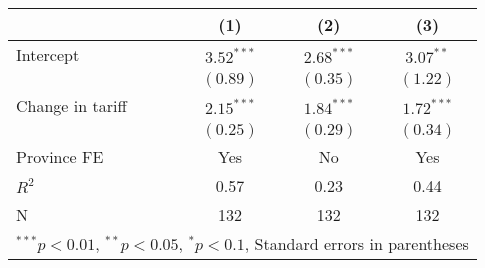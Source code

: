 
\begin{tabular}{l c c c }
\hline
 & (1) & (2) & (3) \\
\hline
Intercept & $3.52^{***}$ & $2.68^{***}$ & $3.07^{**}$  \\
            & $(0.89)$     & $(0.35)$     & $(1.22)$     \\
Change in tariff     & $2.15^{***}$ & $1.84^{***}$ & $1.72^{***}$ \\
            & $(0.25)$     & $(0.29)$     & $(0.34)$     \\
\hline
Province FE &  Yes         & No      & Yes             \\ 
\hline
$R^2$       & 0.57         & 0.23         & 0.44         \\
N           & 132          & 132          & 132          \\
\hline
\multicolumn{4}{l}{\scriptsize{$^{***}p<0.01$, $^{**}p<0.05$, $^*p<0.1$, Standard errors in parentheses}}
\end{tabular}
